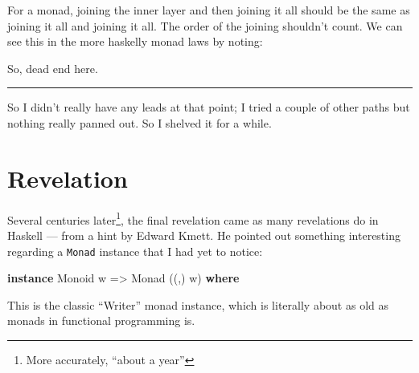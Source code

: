 \documentclass[]{article}
\newenvironment{Shaded}{}{}
\newcommand{\DataTypeTok}[1]{\textcolor[rgb]{0.56,0.13,0.00}{#1}}
\newcommand{\DecValTok}[1]{\textcolor[rgb]{0.25,0.63,0.44}{#1}}
\newcommand{\FunctionTok}[1]{\textcolor[rgb]{0.02,0.16,0.49}{#1}}
\newcommand{\KeywordTok}[1]{\textcolor[rgb]{0.00,0.44,0.13}{\textbf{#1}}}
\newcommand{\NormalTok}[1]{#1}
\newcommand{\OperatorTok}[1]{\textcolor[rgb]{0.40,0.40,0.40}{#1}}
\newcommand{\OtherTok}[1]{\textcolor[rgb]{0.00,0.44,0.13}{#1}}
\begin{document}
\begin{itemize}
  For a monad, joining the inner layer and then joining it all should be the
  same as joining it all and joining it all. The order of the joining shouldn't
  count. We can see this in the more haskelly monad laws by noting:

\begin{Shaded}
\end{Shaded}

  So, dead end here.
\end{itemize}

\begin{center}\rule{0.5\linewidth}{0.5pt}\end{center}

So I didn't really have any leads at that point; I tried a couple of other paths
but nothing really panned out. So I shelved it for a while.

\section{Revelation}\label{revelation}

Several centuries later\footnote{More accurately, ``about a year''}, the final
revelation came as many revelations do in Haskell --- from a hint by Edward
Kmett. He pointed out something interesting regarding a \texttt{Monad} instance
that I had yet to notice:

\begin{Shaded}
\begin{Highlighting}[]
\KeywordTok{instance} \DataTypeTok{Monoid}\NormalTok{ w }\OtherTok{=\textgreater{}} \DataTypeTok{Monad}\NormalTok{ ((,) w) }\KeywordTok{where}
\end{Highlighting}
\end{Shaded}

This is the classic ``Writer'' monad instance, which is literally about as old
as monads in functional programming is.
\end{document}
